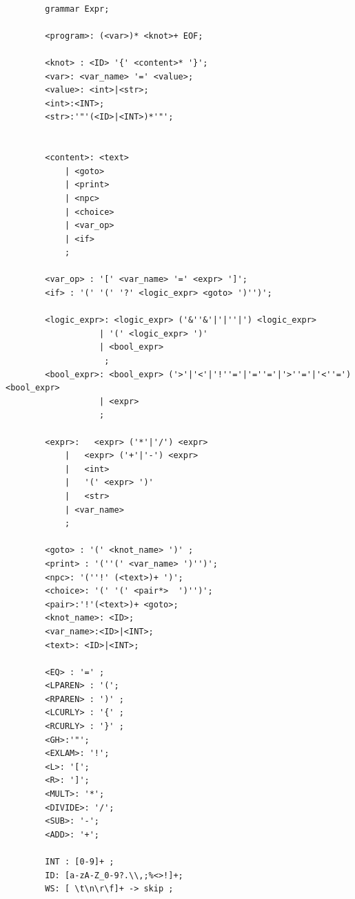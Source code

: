 \begin{verbatim}
    
        grammar Expr;
        
        <program>: (<var>)* <knot>+ EOF;
        
        <knot> : <ID> '{' <content>* '}'; 
        <var>: <var_name> '=' <value>;
        <value>: <int>|<str>;
        <int>:<INT>;
        <str>:'"'(<ID>|<INT>)*'"';
        
        
        <content>: <text>
            | <goto>
            | <print>
            | <npc>
            | <choice>
            | <var_op>
            | <if>
            ;
        
        <var_op> : '[' <var_name> '=' <expr> ']';
        <if> : '(' '(' '?' <logic_expr> <goto> ')'')';
        
        <logic_expr>: <logic_expr> ('&''&'|'|''|') <logic_expr>
                   | '(' <logic_expr> ')'
                   | <bool_expr>
                    ;
        <bool_expr>: <bool_expr> ('>'|'<'|'!''='|'=''='|'>''='|'<''=') <bool_expr>
                   | <expr>
                   ;
        
        <expr>:   <expr> ('*'|'/') <expr>
            |   <expr> ('+'|'-') <expr>
            |   <int>
            |   '(' <expr> ')'
            |   <str>
            | <var_name>
            ;
        
        <goto> : '(' <knot_name> ')' ;
        <print> : '(''(' <var_name> ')'')';
        <npc>: '(''!' (<text>)+ ')';
        <choice>: '(' '(' <pair*>  ')'')';
        <pair>:'!'(<text>)+ <goto>;
        <knot_name>: <ID>;
        <var_name>:<ID>|<INT>;
        <text>: <ID>|<INT>;
        
        <EQ> : '=' ;
        <LPAREN> : '('; 
        <RPAREN> : ')' ;
        <LCURLY> : '{' ;
        <RCURLY> : '}' ;
        <GH>:'"';
        <EXLAM>: '!';
        <L>: '[';
        <R>: ']';
        <MULT>: '*';
        <DIVIDE>: '/';
        <SUB>: '-';
        <ADD>: '+';
        
        INT : [0-9]+ ;
        ID: [a-zA-Z_0-9?.\\,;%<>!]+; 
        WS: [ \t\n\r\f]+ -> skip ;
\end{verbatim}


